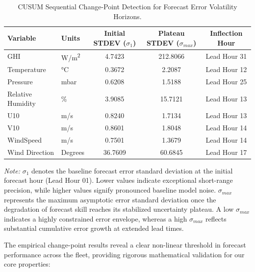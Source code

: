 \begin{table}[H]
\centering
\begin{threeparttable}
\caption{CUSUM Sequential Change-Point Detection for Forecast Error Volatility Horizons.}
\label{tab:cusum_results}
\begin{tabular}{llccc}
\toprule
\textbf{Variable} & \textbf{Units} & \textbf{Initial STDEV ($\sigma_1$)} & \textbf{Plateau STDEV ($\sigma_{max}$)} & \textbf{Inflection Hour} \\
\midrule
GHI               & \si{W/m^2}          & \num{4.7423}   & \num{212.8066} & Lead Hour 31 \\
Temperature   & \si{\degreeCelsius} & \num{0.3672}   & \num{2.2087}   & Lead Hour 12 \\
Pressure   & mbar                & \num{0.6208}   & \num{1.5188}   & Lead Hour 25 \\
Relative Humidity          & \si{\percent}       & \num{3.9085}   & \num{15.7121}  & Lead Hour 13 \\
U10               & \si{m/s}            & \num{0.8240}   & \num{1.7134}   & Lead Hour 13 \\
V10               & \si{m/s}            & \num{0.8601}   & \num{1.8048}   & Lead Hour 14 \\
WindSpeed    & \si{m/s}            & \num{0.7501}   & \num{1.3679}   & Lead Hour 14 \\
Wind Direction      & Degrees             & \num{36.7609}  & \num{60.6845}  & Lead Hour 17 \\
\bottomrule
\end{tabular}
\begin{tablenotes}
\scriptsize

    \item \textit{Note:} $\sigma_1$ denotes the baseline forecast error standard deviation at the initial forecast hour (Lead Hour 01). Lower values indicate exceptional short-range precision, while higher values signify pronounced baseline model noise. $\sigma_{max}$ represents the maximum asymptotic error standard deviation once the degradation of forecast skill reaches its stabilized uncertainty plateau. A low $\sigma_{max}$ indicates a highly constrained error envelope, whereas a high $\sigma_{max}$ reflects substantial cumulative error growth at extended lead times.
\end{tablenotes}
\end{threeparttable}
\end{table}

The empirical change-point results reveal a clear non-linear threshold in forecast performance across the fleet, providing rigorous mathematical validation for our core properties:

